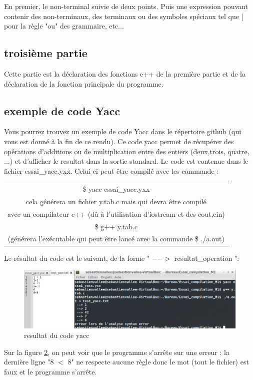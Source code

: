 En premier, le non-terminal suivie de deux points. Puis une expression pouvant contenir des non-terminaux, des terminaux ou des symboles spéciaux tel que | pour la règle "ou" des grammaire, etc...

\subsection{troisième partie}
Cette partie est la déclaration des fonctions c++ de la première partie et de la déclaration de la fonction principale du programme.

\subsection{exemple de code Yacc}
Vous pourrez trouvez un exemple de code Yacc dans le répertoire github (qui vous est donné à la fin de ce rendu).
Ce code yacc permet de récupérer des opérations d'additions ou de multiplication entre des entiers (deux,trois, quatre, ...) et d'afficher le resultat dans la sortie standard. Le code est contenue dans le fichier essai\_yacc.yxx.
Celui-ci peut être compilé avec les commande :\newline

\begin{tabular}{|c|}
    \hline
        \$ yacc essai\_yacc.yxx \\
        cela générera un fichier y.tab.c mais qui devra être compilé \\
         avec un compilateur c++ (dû à l'utilisation d'iostream et des cout,cin)\\
    \hline
        \$ g++ y.tab.c \\
        (générera l'exécutable qui peut être lancé avec la commande \$ ./a.out) \\
    \hline
\end{tabular}
\newline

Le résultat du code est le suivant, de la forme " $-->$ resultat\_operation ":
\newline

\begin{figure}[h]
    \centerline{\includegraphics[scale=0.7]{data/yacc}}
    \caption{resultat du code yacc}
    \label{fig:yacc}
\end{figure}

Sur la figure \href{fig:yacc}{2}, on peut voir que le programme s'arrête sur une erreur : la dernière ligne "8 $<$ 8" ne respecte aucune règle donc le mot (tout le fichier) est faux et le programme s'arrête.

\newpage